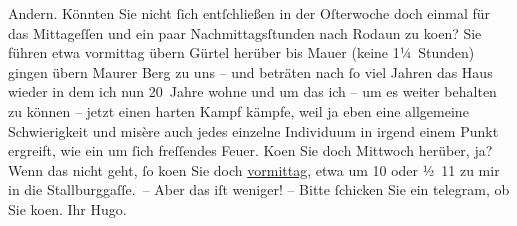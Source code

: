 \begin{ledgroupsized}[t]{13cm}
               Andern.\pend
           \pstart
           Könnten Sie nicht ſich entſchließen in der Oſterwoche doch einmal für
               das Mittageſſen und ein paar Nachmittagsſtunden nach Rodaun zu ko{\geminationm}en? {\pb}Sie führen etwa vormittag übern
                  Gürtel herüber bis Mauer (keine 1¼ Stunden) gingen übern Maurer
                  Berg zu uns – und beträten nach ſo viel Jahren das Haus wieder in dem ich nun 20 Jahre wohne und
               um das ich – um es weiter behalten zu können – jetzt einen harten Kampf kämpfe, weil
               ja eben eine {\pb}allgemeine
               Schwierigkeit und misère auch jedes einzelne Individuum in irgend einem Punkt
               ergreift, wie ein um ſich freſſendes Feuer.\pend
           \pstart
           Ko{\geminationm}en Sie doch Mittwoch herüber, ja?\pend
           \pstart
           Wenn das nicht geht, ſo ko{\geminationm}en Sie doch \label{K_L02364_1v}\label{K_L02364_1h}{ }\uline{vormittag}, etwa um 10 oder ½ 11 zu mir in die Stallburggaſſe. – Aber das iſt weniger! – Bitte
               ſchicken Sie ein telegram, ob Sie ko{\geminationm}en.\pend
           \pstart Ihr \spacefill\mbox{Hugo.}\pend{}          \endnumbering{}\end{ledgroupsized}  \newcommand{\dateiname}{L02364}\newcommand{\titel}{Hugo Hofmannsthal an Arthur Schnitzler, [19. 3. 1921]}\newcommand{\editorInnen}{Martin Anton Müller und Gerd-Hermann Susen}
            \footnotesize
\begin{ledgroupsized}[t]{11.5cm}
\end{ledgroupsized}
         
      